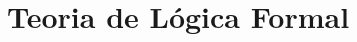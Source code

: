 \documentclass[10pt,a4paper]{report}
\begin{document}

















































\chapter{Teoria de Lógica Formal}

\hspace{\baselineskip}
\end{document}
